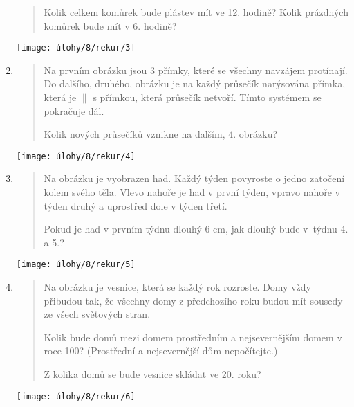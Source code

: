 \begin{enumerate}
\begin{minipage}[t]{\linewidth}
\begin{quote}
            Kolik celkem komůrek bude plástev mít ve 12. hodině? Kolik prázdných komůrek bude mít v 6. hodině?
        \end{quote}
        \centering
        \texttt{[image: úlohy/8/rekur/3]}
    \end{minipage}

    \item
    \begin{minipage}[t]{\linewidth}
        \begin{quote}
            Na prvním obrázku jsou 3 přímky, které se všechny navzájem protínají. Do dalšího, druhého, obrázku je na každý průsečík narýsována přímka, která je $\|$ s přímkou, která průsečík netvoří. Tímto systémem se pokračuje dál.

            Kolik nových průsečíků vznikne na dalším, 4. obrázku?
        \end{quote}
        \centering
        \texttt{[image: úlohy/8/rekur/4]}
    \end{minipage}

    \item
    \begin{minipage}[t]{\linewidth}
        \begin{quote}
            Na obrázku je vyobrazen had. Každý týden povyroste o jedno zatočení kolem svého těla. Vlevo nahoře je had v první týden, vpravo nahoře v týden druhý a uprostřed dole v týden třetí.

            Pokud je had v prvním týdnu dlouhý 6 cm, jak dlouhý bude v~týdnu 4. a 5.?
        \end{quote}
        \centering
        \texttt{[image: úlohy/8/rekur/5]}
    \end{minipage}

    \item
    \begin{minipage}[t]{\linewidth}
        \begin{quote}
            Na obrázku je vesnice, která se každý rok rozroste. Domy vždy přibudou tak, že všechny domy z předchozího roku budou mít sousedy ze všech světových stran.

            Kolik bude domů mezi domem prostředním a nejsevernějším domem v roce 100? (Prostřední a nejsevernější dům nepočítejte.)

            Z kolika domů se bude vesnice skládat ve 20. roku?
        \end{quote}
        \centering
        \texttt{[image: úlohy/8/rekur/6]}
    \end{minipage}


\end{enumerate}

